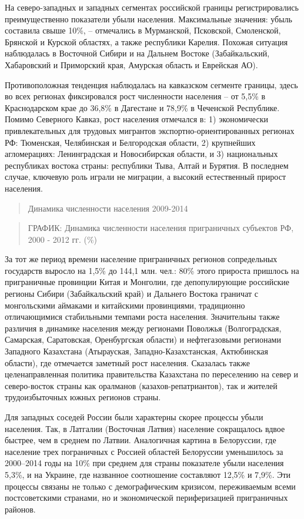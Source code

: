 \documentclass[]{book}
\begin{document}
На северо-западных и западных сегментах российской границы
регистрировались преимущественно показатели убыли населения.
Максимальные значения: убыль составила свыше 10\%, -- отмечались в
Мурманской, Псковской, Смоленской, Брянской и Курской областях, а также
республики Карелия. Похожая ситуация наблюдалась в Восточной Сибири и на
Дальнем Востоке (Забайкальский, Хабаровский и Приморский края, Амурская
область и Еврейская АО).

Противоположная тенденция наблюдалась на кавказском сегменте границы,
здесь во всех регионах фиксировался рост численности населения -- от
5,5\% в Краснодарском крае до 36,8\% в Дагестане и 78,9\% в Чеченской
Республике. Помимо Северного Кавказ, рост населения отмечался в: 1)
экономически привлекательных для трудовых мигрантов
экспортно-ориентированных регионах РФ: Тюменская, Челябинская и
Белгородская области, 2) крупнейших агломерациях: Ленинградская и
Новосибирская области, и 3) национальных республиках востока страны:
республики Тыва, Алтай и Бурятия. В последнем случае, ключевую роль
играли не миграции, а высокий естественный прирост населения.

\begin{quote}
Динамика численности населения 2009-2014
\end{quote}

\begin{quote}
ГРАФИК: Динамика численности населения приграничных субъектов РФ, 2000 -
2012 гг. (\%)
\end{quote}

За тот же период времени население приграничных регионов сопредельных
государств выросло на 1,5\% до 144,1 млн. чел.: 80\% этого прироста
пришлось на приграничные провинции Китая и Монголии, где депопулирующие
российские регионы Сибири (Забайкальский край) и Дальнего Востока
граничат с монгольскими аймаками и китайскими провинциями, традиционно
отличающимися стабильными темпами роста населения. Значительны также
различия в динамике населения между регионами Поволжья (Волгоградская,
Самарская, Саратовская, Оренбургская области) и нефтегазовыми регионами
Западного Казахстана (Атырауская, Западно-Казахстанская, Актюбинская
области), где отмечается заметный рост населения. Сказалась также
целенаправленная политика правительства Казахстана по переселению на
север и северо-восток страны как оралманов (казахов-репатриантов), так и
жителей трудоизбыточных южных регионов страны.

Для западных соседей России были характерны скорее процессы убыли
населения. Так, в Латгалии (Восточная Латвия) население сокращалось
вдвое быстрее, чем в среднем по Латвии. Аналогичная картина в
Белоруссии, где население трех пограничных с Россией областей Белоруссии
уменьшилось за 2000--2014 годы на 10\% при среднем для страны показателе
убыли населения 5,3\%, и на Украине, где названное соотношение
составляют 12,5\% и 7,9\%. Эти процессы связаны не только с
демографическим кризисом, переживаемым всеми постсоветскими странами, но
и экономической периферизацией приграничных районов.
\end{document}
